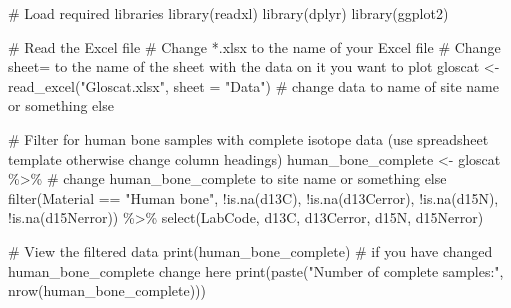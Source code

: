 \documentclass[
]{agujournal2019}
\newenvironment{Shaded}{\begin{snugshade}}{\end{snugshade}}
\newcommand{\AttributeTok}[1]{\textcolor[rgb]{0.40,0.45,0.13}{#1}}
\newcommand{\CommentTok}[1]{\textcolor[rgb]{0.37,0.37,0.37}{#1}}
\newcommand{\FunctionTok}[1]{\textcolor[rgb]{0.28,0.35,0.67}{#1}}
\newcommand{\NormalTok}[1]{\textcolor[rgb]{0.00,0.23,0.31}{#1}}
\newcommand{\OtherTok}[1]{\textcolor[rgb]{0.00,0.23,0.31}{#1}}
\newcommand{\SpecialCharTok}[1]{\textcolor[rgb]{0.37,0.37,0.37}{#1}}
\newcommand{\StringTok}[1]{\textcolor[rgb]{0.13,0.47,0.30}{#1}}
\begin{document}
\begin{Shaded}
\begin{Highlighting}[]
\CommentTok{\# Load required libraries}
\FunctionTok{library}\NormalTok{(readxl)}
\FunctionTok{library}\NormalTok{(dplyr)}
\FunctionTok{library}\NormalTok{(ggplot2)}

\CommentTok{\# Read the Excel file}
\CommentTok{\# Change *.xlsx to the name of your Excel file}
\CommentTok{\# Change sheet= to the name of the sheet with the data on it you want to plot}
\NormalTok{gloscat }\OtherTok{\textless{}{-}} \FunctionTok{read\_excel}\NormalTok{(}\StringTok{"Gloscat.xlsx"}\NormalTok{, }\AttributeTok{sheet =} \StringTok{"Data"}\NormalTok{) }\CommentTok{\# change data to name of site name or something else}

\CommentTok{\# Filter for human bone samples with complete isotope data (use spreadsheet template otherwise change column headings)}
\NormalTok{human\_bone\_complete }\OtherTok{\textless{}{-}}\NormalTok{ gloscat }\SpecialCharTok{\%\textgreater{}\%} \CommentTok{\# change human\_bone\_complete to site name or something else}
  \FunctionTok{filter}\NormalTok{(Material }\SpecialCharTok{==} \StringTok{"Human bone"}\NormalTok{,}
         \SpecialCharTok{!}\FunctionTok{is.na}\NormalTok{(d13C), }\SpecialCharTok{!}\FunctionTok{is.na}\NormalTok{(d13Cerror),}
         \SpecialCharTok{!}\FunctionTok{is.na}\NormalTok{(d15N), }\SpecialCharTok{!}\FunctionTok{is.na}\NormalTok{(d15Nerror)) }\SpecialCharTok{\%\textgreater{}\%}
  \FunctionTok{select}\NormalTok{(LabCode, d13C, d13Cerror, d15N, d15Nerror)}

\CommentTok{\# View the filtered data}
\FunctionTok{print}\NormalTok{(human\_bone\_complete) }\CommentTok{\# if you have changed human\_bone\_complete change here}
\FunctionTok{print}\NormalTok{(}\FunctionTok{paste}\NormalTok{(}\StringTok{"Number of complete samples:"}\NormalTok{, }\FunctionTok{nrow}\NormalTok{(human\_bone\_complete))) }


\end{Highlighting}
\end{Shaded}
\end{document}
